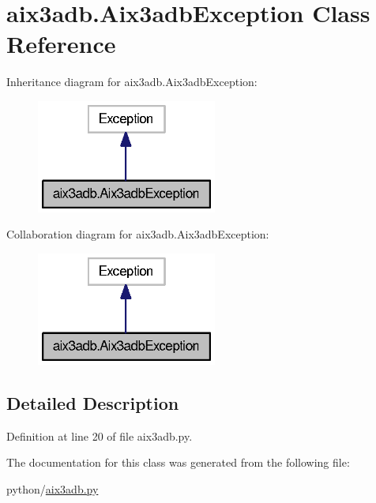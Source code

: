 \section{aix3adb.\-Aix3adb\-Exception Class Reference}
\label{classaix3adb_1_1Aix3adbException}


Inheritance diagram for aix3adb.\-Aix3adb\-Exception\-:
\nopagebreak
\begin{figure}[H]
\begin{center}
\leavevmode
\includegraphics[width=168pt]{classaix3adb_1_1Aix3adbException__inherit__graph}
\end{center}
\end{figure}


Collaboration diagram for aix3adb.\-Aix3adb\-Exception\-:
\nopagebreak
\begin{figure}[H]
\begin{center}
\leavevmode
\includegraphics[width=168pt]{classaix3adb_1_1Aix3adbException__coll__graph}
\end{center}
\end{figure}


\subsection{Detailed Description}


Definition at line 20 of file aix3adb.\-py.



The documentation for this class was generated from the following file\-:\begin{DoxyCompactItemize}
\item 
python/\hyperlink{aix3adb_8py}{aix3adb.\-py}\end{DoxyCompactItemize}

